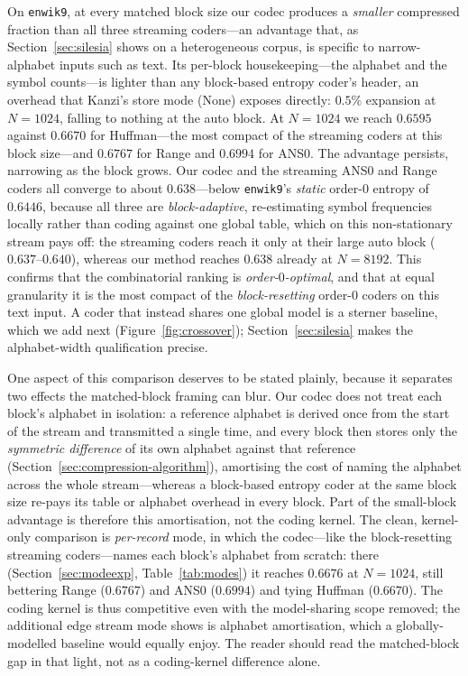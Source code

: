 \documentclass[entropy,article,submit,oneauthor,pdftex]{Definitions/mdpi}
\begin{document}
On \texttt{enwik9}, at every matched block size our codec produces a
\emph{smaller} compressed fraction than all three streaming coders---an advantage
that, as Section~\ref{sec:silesia} shows on a heterogeneous corpus, is specific to
narrow-alphabet inputs such as text. Its per-block housekeeping---the
alphabet and the symbol counts---is lighter than any block-based entropy coder's
header, an overhead that Kanzi's store mode (None) exposes directly: $0.5\%$
expansion at $N=1024$, falling to nothing at the auto block. At $N=1024$ we
reach $0.6595$ against $0.6670$ for Huffman---the most compact of the streaming
coders at this block size---and $0.6767$ for Range and $0.6994$ for ANS0. The
advantage persists, narrowing as the block grows. Our codec and the streaming ANS0 and
Range coders all converge to about $0.638$---below \texttt{enwik9}'s \emph{static} order-$0$
entropy of $0.6446$, because all three are \emph{block-adaptive}, re-estimating symbol
frequencies locally rather than coding against one global table, which on this
non-stationary stream pays off: the streaming coders reach it only at their large auto
block ($0.637$--$0.640$), whereas our method reaches $0.638$ already at $N=8192$. This
confirms that the combinatorial ranking is \emph{order-$0$-optimal}, and that at equal
granularity it is the most compact of the \emph{block-resetting} order-$0$ coders on this
text input. A coder that instead shares one global model is a sterner baseline, which we
add next (Figure~\ref{fig:crossover}); Section~\ref{sec:silesia} makes the alphabet-width
qualification precise.

One aspect of this comparison deserves to be stated plainly, because it separates two
effects the matched-block framing can blur. Our codec does not treat each block's
alphabet in isolation: a reference alphabet is derived once from the start of the stream
and transmitted a single time, and every block then stores only the \emph{symmetric
difference} of its own alphabet against that reference
(Section~\ref{sec:compression-algorithm}), amortising the cost of naming the alphabet
across the whole stream---whereas a block-based entropy coder at the same block size
re-pays its table or alphabet overhead in every block. Part of the small-block advantage
is therefore this amortisation, not the coding kernel. The clean, kernel-only comparison
is \emph{per-record} mode, in which the codec---like the block-resetting streaming
coders---names each block's alphabet from scratch: there (Section~\ref{sec:modeexp},
Table~\ref{tab:modes}) it reaches $0.6676$ at $N{=}1024$, still bettering Range ($0.6767$)
and ANS0 ($0.6994$) and tying Huffman ($0.6670$). The coding kernel is thus competitive
even with the model-sharing scope removed; the additional edge stream mode shows is
alphabet amortisation, which a globally-modelled baseline would equally enjoy. The reader
should read the matched-block gap in that light, not as a coding-kernel difference alone.
\end{document}
